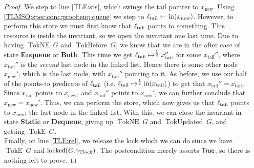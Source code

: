 \documentclass[a4paper, 10pt]{report}
\theoremstyle{definition}
\newcommand{\locked}{\operatorname{locked}}
\newcommand{\locN}[1]{\loc_{\mathrm{#1}}}
\newcommand{\loctail}{\locN{tail}}
\newcommand{\nIn}[1]{\operatorname{in}(#1)}
\newcommand{\node}{x}
\newcommand{\nodeN}[1]{\node_{\mathrm{#1}}}
\newcommand{\nodetail}{\nodeN{tail}}
\newcommand{\nodenew}{\nodeN{new}}
\newcommand{\StaticState}{\textbf{Static}\xspace}
\newcommand{\EnqueueState}{\textbf{Enqueue}\xspace}
\newcommand{\DequeueState}{\textbf{Dequeue}\xspace}
\newcommand{\BothState}{\textbf{Both}\xspace}
\newcommand{\Qg}{G}
\newcommand{\gtlock}{\gname_{\mathrm{Tlock}}}
\newcommand{\TokE}[1]{\operatorname{TokE} ~ #1}
\newcommand{\TokEQg}{\TokE{\Qg}}
\newcommand{\TokNE}[1]{\operatorname{TokNE} ~ #1}
\newcommand{\TokNEQg}{\TokNE{\Qg}}
\newcommand{\TokBefore}[1]{\operatorname{TokBefore} ~ #1}
\newcommand{\TokBeforeQg}{\TokBefore{\Qg}}
\newcommand{\TokUpdated}[1]{\operatorname{TokUpdated} ~ #1}
\newcommand{\TokUpdatedQg}{\TokUpdated{\Qg}}
\begin{document}
\begin{proof}
We step to line \ref{TLE:sts}, which swings the tail pointer to $\nodenew$. Using \ref{TLMSQ:spec:conc:proof:enq:queue} we step to $\loctail \gets \nIn{\nodenew}$. However, to perform this store we must first know that $\loctail$ points to something. This resource is inside the invariant, so we open the invariant one last time. Due to having $\TokNEQg$ and $\TokBeforeQg$, we know that we are in the after case of state \EnqueueState or \BothState. This time we get $\loctail \mapsto^{\frac{1}{2}} \nodetail''$ for some $\nodetail''$, where $\nodetail''$ is the \textit{second} last node in the linked list. Hence there is some other node $\nodenew'$, which is the last node, with $\nodetail''$ pointing to it. As before, we use our half of the points-to predicate of $\loctail$ (i.e. $\loctail \mapsto^{\frac{1}{2}} \nIn{\nodetail}$) to get that $\nodetail'' = \nodetail$. Since $\nodetail$ points to $\nodenew$, and $\nodetail''$ points to $\nodenew'$, we can further conclude that $\nodenew = \nodenew'$. Thus, we can perform the store, which now gives us that $\loctail$ points to $\nodenew$; the last node in the linked list. With this, we can close the invariant in state \StaticState or \DequeueState, giving up $\TokNEQg$ and $\TokUpdatedQg$, and getting $\TokEQg$.\\
Finally, on line \ref{TLE:rel}, we release the lock which we can do since we have $\TokEQg$ and $\locked(\Qg.\gtlock)$. The postcondition merely asserts $\textsf{True}$, so there is nothing left to prove.
\end{proof}
\end{document}
